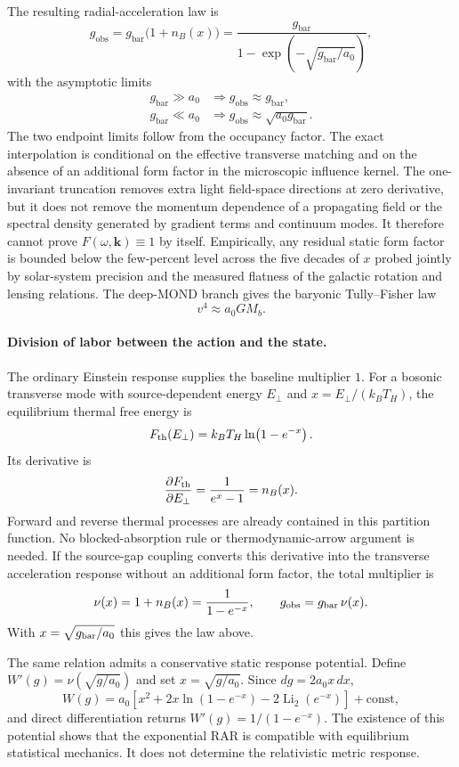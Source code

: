 \documentclass[11pt]{article}
\begin{document}
The resulting radial-acceleration law is
\[
g_{\mathrm{obs}}
=
g_{\mathrm{bar}}\bigl(1+n_B(x)\bigr)
=
\frac{g_{\mathrm{bar}}}{1-\exp\!\left(-\sqrt{g_{\mathrm{bar}}/a_0}\right)},
\]
with the asymptotic limits
\begin{align}
g_{\mathrm{bar}}\gg a_0 &\Longrightarrow g_{\mathrm{obs}}\approx g_{\mathrm{bar}},\\
g_{\mathrm{bar}}\ll a_0 &\Longrightarrow g_{\mathrm{obs}}\approx \sqrt{a_0g_{\mathrm{bar}}}.
\end{align}
The two endpoint limits follow from the occupancy factor. The exact interpolation is conditional on the effective transverse matching and on the absence of an additional form factor in the microscopic influence kernel. The one-invariant truncation removes extra light field-space directions at zero derivative, but it does not remove the momentum dependence of a propagating field or the spectral density generated by gradient terms and continuum modes. It therefore cannot prove $F(\omega,\mathbf k)\equiv1$ by itself. Empirically, any residual static form factor is bounded below the few-percent level across the five decades of $x$ probed jointly by solar-system precision and the measured flatness of the galactic rotation and lensing relations.
The deep-MOND branch gives the baryonic Tully--Fisher law \citep{TullyFisher1977,McGaugh2000}
\[
v^4\approx a_0GM_b.
\]

\paragraph{Division of labor between the action and the state.}
The ordinary Einstein response supplies the baseline multiplier $1$. For a bosonic transverse mode with source-dependent energy $E_\perp$ and $x=E_\perp/(k_BT_H)$, the equilibrium thermal free energy is
\[
F_{\rm th}(E_\perp)=k_BT_H\ln\!\left(1-e^{-x}\right).
\]
Its derivative is
\[
\frac{\partial F_{\rm th}}{\partial E_\perp}
=\frac{1}{e^x-1}=n_B(x).
\]
Forward and reverse thermal processes are already contained in this partition function. No blocked-absorption rule or thermodynamic-arrow argument is needed. If the source-gap coupling converts this derivative into the transverse acceleration response without an additional form factor, the total multiplier is
\[
\nu(x)=1+n_B(x)=\frac{1}{1-e^{-x}},
\qquad
g_{\rm obs}=g_{\rm bar}\,\nu(x).
\]
With $x=\sqrt{g_{\rm bar}/a_0}$ this gives the law above.

The same relation admits a conservative static response potential. Define $W'(g)=\nu(\sqrt{g/a_0})$ and set $x=\sqrt{g/a_0}$. Since $dg=2a_0x\,dx$,
\[
W(g)=a_0\!\left[
x^2+2x\ln(1-e^{-x})-2\operatorname{Li}_2(e^{-x})
\right]+\mathrm{const},
\]
and direct differentiation returns $W'(g)=1/(1-e^{-x})$. The existence of this potential shows that the exponential RAR is compatible with equilibrium statistical mechanics. It does not determine the relativistic metric response.
\end{document}
